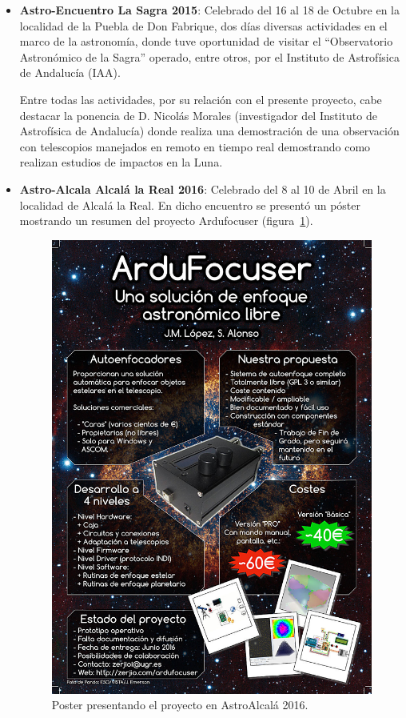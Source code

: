 \begin{itemize}
	\item \textbf{Astro-Encuentro La Sagra 2015}: Celebrado del 16 al 18 de Octubre en la localidad de la Puebla de Don Fabrique, dos días diversas actividades en el marco de la astronomía, donde tuve oportunidad de visitar el ``Observatorio Astronómico de la Sagra'' \cite{lasagra} operado, entre otros, por el Instituto de Astrofísica de Andalucía (IAA).
	
	Entre todas las actividades, por su relación con el presente proyecto, cabe destacar la ponencia de D. Nicolás Morales (investigador del Instituto de Astrofísica de Andalucía) donde realiza una demostración de una observación con telescopios manejados en remoto en tiempo real demostrando como realizan estudios de impactos en la Luna.
	
	\item \textbf{Astro-Alcala Alcalá la Real 2016}: Celebrado del 8 al 10 de Abril en la localidad de Alcalá la Real. En dicho encuentro se presentó un póster mostrando un resumen del proyecto Ardufocuser (figura~\ref{fig:posterAstroAlcala}).
	
\begin{figure}[h]
	\centering
	\includegraphics[width=1\linewidth]{../images/poster_Ardufocuser_AstroAlcala}
	\caption[Poster presentando el proyecto en AstroAlcalá 2016]{Poster presentando el proyecto en AstroAlcalá 2016.}
	\label{fig:posterAstroAlcala}
\end{figure}
	

\end{itemize}
